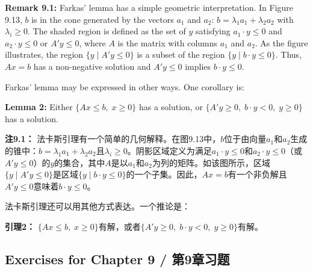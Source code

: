 \begin{original}
\textbf{Remark 9.1:} Farkas' lemma has a simple geometric interpretation. In Figure 9.13, $b$ is in the cone generated by the vectors $a_1$ and $a_2$: $b = \lambda_1 a_1 + \lambda_2 a_2$ with $\lambda_i \ge 0$. The shaded region is defined as the set of $y$ satisfying $a_1 \cdot y \le 0$ and $a_2 \cdot y \le 0$ or $A'y \le 0$, where $A$ is the matrix with columns $a_1$ and $a_2$. As the figure illustrates, the region $\{y \mid A'y \le 0\}$ is a subset of the region $\{y \mid b \cdot y \le 0\}$. Thus, $Ax = b$ has a non-negative solution and $A'y \le 0$ implies $b \cdot y \le 0$.

Farkas' lemma may be expressed in other ways. One corollary is:

\textbf{Lemma 2:} Either $\{Ax \le b, \; x \ge 0\}$ has a solution, or $\{A'y \ge 0, \; b \cdot y < 0, \; y \ge 0\}$ has a solution.
\end{original}
\begin{translation}
\textbf{注9.1：} 法卡斯引理有一个简单的几何解释。在图9.13中，$b$位于由向量$a_1$和$a_2$生成的锥中：$b = \lambda_1 a_1 + \lambda_2 a_2$且$\lambda_i \ge 0$。阴影区域定义为满足$a_1 \cdot y \le 0$和$a_2 \cdot y \le 0$（或$A'y \le 0$）的$y$的集合，其中$A$是以$a_1$和$a_2$为列的矩阵。如该图所示，区域$\{y \mid A'y \le 0\}$是区域$\{y \mid b \cdot y \le 0\}$的一个子集。因此，$Ax = b$有一个非负解且$A'y \le 0$意味着$b \cdot y \le 0$。

法卡斯引理还可以用其他方式表达。一个推论是：

\textbf{引理2：} $\{Ax \le b, \; x \ge 0\}$有解，或者$\{A'y \ge 0, \; b \cdot y < 0, \; y \ge 0\}$有解。
\end{translation}

\subsection*{Exercises for Chapter 9 / 第9章习题}

